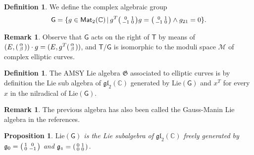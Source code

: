 \documentclass{article}
\numberwithin{equation}{section}
\numberwithin{figure}{section}
\theoremstyle{plain}
\newtheorem{proposition}[theorem]{Proposition}
\theoremstyle{definition}
\newtheorem{remark}[theorem]{Remark}
\newtheorem{definition}[theorem]{Definition}
\numberwithin{equation}{section}
\newtheorem[S, bodystyle=\normalfont\noindent]{defiS}{Definition}[section]
\begin{document}
\begin{definition} We define the complex algebraic group
\begin{equation*}
\mathsf{G}=\{g\in \mathsf{Mat}_{2}(\mathbb{C})\, | \, g^T\begin{psmallmatrix} 0 & 1 \\ -1& 0\end{psmallmatrix} g=\begin{psmallmatrix} 0 & 1 \\ -1& 0\end{psmallmatrix}\land g_{21}=0 \}.
\end{equation*}
\end{definition}
\begin{remark}
Observe that $\mathsf{G}$ acts on the right of $\mathsf{T}$ by means of $(E,\begin{psmallmatrix}\alpha\\\beta\end{psmallmatrix})\cdot g= (E,g^T\begin{psmallmatrix}\alpha\\\beta\end{psmallmatrix})$, and $\mathsf{T}/\mathsf{G}$ is isomorphic to the moduli space $\mathcal{M}$ of complex elliptic curves.
\end{remark}

\begin{definition}
The AMSY Lie algebra $\mathfrak{G}$ associated to elliptic curves is by definition the Lie sub algebra of $\mathfrak{gl}_2(\mathbb{C})$ generated by $\text{Lie}(\mathsf{G})$ and $x^T$ for every $x$ in the nilradical of $\text{Lie}(\mathsf{G})$.
\end{definition}

\begin{remark}
The previous algebra has also been called the Gauss-Manin Lie algebra in the references.
\end{remark}

\begin{proposition}
$\text{Lie}(\mathsf{G})$ is the Lie subalgebra of $\mathfrak{gl}_2(\mathbb{C})$ freely generated by $\mathfrak{g}_0=\begin{psmallmatrix} 1 & 0 \\ 0& -1\end{psmallmatrix}$ and $\mathfrak{g_1}=\begin{psmallmatrix} 0 & 1 \\ 0& 0\end{psmallmatrix}$. 
\end{proposition}
\end{document}
